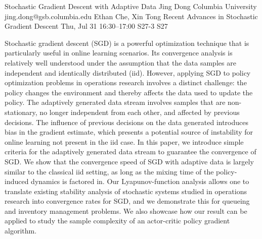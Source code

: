 \documentclass[12pt,lettersize,oneside]{book} %
\begin{document}
\begin{talk}
  {Stochastic Gradient Descent with Adaptive Data}%
  {Jing Dong}%
  {Columbia University}%
  {jing.dong@gsb.columbia.edu}%
  {Ethan Che, Xin Tong}%
  {Recent Advances in Stochastic Gradient Descent}%
  {Thu, Jul 31 16:30--17:00}%
  {S27-3}%
  {S27}%
    
                
Stochastic gradient descent (SGD) is a powerful optimization technique that is particularly useful in online learning scenarios. Its convergence analysis is relatively well understood under the assumption that the data samples are independent and identically distributed (iid). However, applying SGD to policy optimization
problems in operations research involves a distinct challenge: the policy changes the environment and thereby affects the data used to update the policy. The adaptively generated data stream involves samples that are non-stationary, no longer independent from each other, and affected by previous decisions. The influence of previous decisions on the data generated introduces bias in the gradient estimate, which presents a potential source of instability for online learning not present in the iid case. In this paper, we introduce simple criteria for the adaptively generated data stream to guarantee the convergence of SGD. We show that the convergence
speed of SGD with adaptive data is largely similar to the classical iid setting, as long as the mixing time of the policy-induced dynamics is factored in. Our Lyapunov-function analysis allows one to translate existing stability analysis of stochastic systems studied in operations research into convergence rates for SGD, and
we demonstrate this for queueing and inventory management problems. We also showcase how our result can be applied to study the sample complexity of an actor-critic policy gradient algorithm.   


\medskip


\end{talk}
\end{document}
